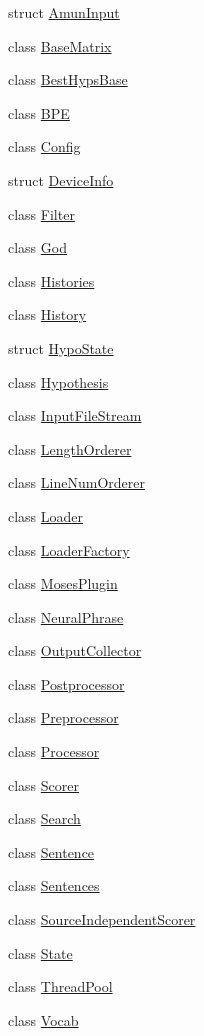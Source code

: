 \begin{DoxyCompactItemize}
\item 
struct \hyperlink{structamunmt_1_1AmunInput}{Amun\+Input}
\item 
class \hyperlink{classamunmt_1_1BaseMatrix}{Base\+Matrix}
\item 
class \hyperlink{classamunmt_1_1BestHypsBase}{Best\+Hyps\+Base}
\item 
class \hyperlink{classamunmt_1_1BPE}{B\+PE}
\item 
class \hyperlink{classamunmt_1_1Config}{Config}
\item 
struct \hyperlink{structamunmt_1_1DeviceInfo}{Device\+Info}
\item 
class \hyperlink{classamunmt_1_1Filter}{Filter}
\item 
class \hyperlink{classamunmt_1_1God}{God}
\item 
class \hyperlink{classamunmt_1_1Histories}{Histories}
\item 
class \hyperlink{classamunmt_1_1History}{History}
\item 
struct \hyperlink{structamunmt_1_1HypoState}{Hypo\+State}
\item 
class \hyperlink{classamunmt_1_1Hypothesis}{Hypothesis}
\item 
class \hyperlink{classamunmt_1_1InputFileStream}{Input\+File\+Stream}
\item 
class \hyperlink{classamunmt_1_1LengthOrderer}{Length\+Orderer}
\item 
class \hyperlink{classamunmt_1_1LineNumOrderer}{Line\+Num\+Orderer}
\item 
class \hyperlink{classamunmt_1_1Loader}{Loader}
\item 
class \hyperlink{classamunmt_1_1LoaderFactory}{Loader\+Factory}
\item 
class \hyperlink{classamunmt_1_1MosesPlugin}{Moses\+Plugin}
\item 
class \hyperlink{classamunmt_1_1NeuralPhrase}{Neural\+Phrase}
\item 
class \hyperlink{classamunmt_1_1OutputCollector}{Output\+Collector}
\item 
class \hyperlink{classamunmt_1_1Postprocessor}{Postprocessor}
\item 
class \hyperlink{classamunmt_1_1Preprocessor}{Preprocessor}
\item 
class \hyperlink{classamunmt_1_1Processor}{Processor}
\item 
class \hyperlink{classamunmt_1_1Scorer}{Scorer}
\item 
class \hyperlink{classamunmt_1_1Search}{Search}
\item 
class \hyperlink{classamunmt_1_1Sentence}{Sentence}
\item 
class \hyperlink{classamunmt_1_1Sentences}{Sentences}
\item 
class \hyperlink{classamunmt_1_1SourceIndependentScorer}{Source\+Independent\+Scorer}
\item 
class \hyperlink{classamunmt_1_1State}{State}
\item 
class \hyperlink{classamunmt_1_1ThreadPool}{Thread\+Pool}
\item 
class \hyperlink{classamunmt_1_1Vocab}{Vocab}
\end{DoxyCompactItemize}
